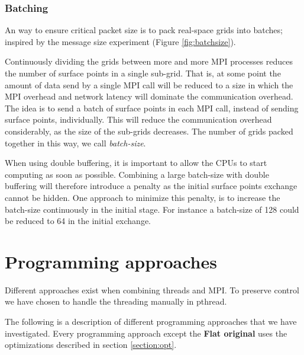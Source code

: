 \documentclass[preprint,3p,times,twocolumn]{elsarticle}
\begin{document}
\subsubsection{Batching}
An way to ensure critical packet size is to pack real-space grids into batches; inspired by the message size experiment (Figure \ref{fig:batchsize}).

Continuously dividing the grids between more and more MPI processes reduces the number of surface points in a single sub-grid. That is, at some point the amount of data send by a single MPI call will be reduced to a size in which the MPI overhead and network latency will dominate the communication overhead. The idea is to send a batch of surface points in each MPI call, instead of sending surface points, individually. This will reduce the communication overhead considerably, as the size of the sub-grids decreases. The number of grids packed together in this way, we call \emph{batch-size}.

When using double buffering, it is important to allow the CPUs to start computing as soon as possible. Combining a large batch-size with double buffering will therefore introduce a penalty as the initial surface points exchange cannot be hidden. One approach to minimize this penalty, is to increase the batch-size continuously in the initial stage. For instance a batch-size of 128 could be reduced to 64 in the initial exchange.

\section{Programming approaches}
Different approaches exist when combining threads and MPI. To preserve control we have chosen to handle the threading manually in pthread.

The following is a description of different programming approaches that we have investigated. Every programming approach except the \textbf{Flat original} uses the optimizations described in section \ref{section:opt}.
\end{document}
